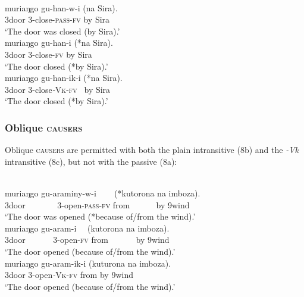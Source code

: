 \documentclass[output=paper]{langsci/langscibook}
\begin{document}
\ea\label{exx:}
\ea
{}\\
\gll muriaŋgo gu-han-w-i            (na Sira).\\
     3door       3-close-\textsc{pass}-\textsc{fv}    by  Sira\\
\glt ‘The door was closed (by Sira).’
\ex
{}\\
\gll muriaŋgo gu-han-i   (*na Sira).\\
     3door      3-close-\textsc{fv}   by   Sira\\
\glt ‘The door closed (*by Sira).’
\ex
{}\\
\gll muriaŋgo gu-han-ik-i     (*na Sira).\\
     3door       3-close\textit{-}\textsc{Vk}-\textsc{fv}~ by  Sira\\
\glt     ‘The door closed (*by Sira).’\\
     \z
     \z
     
\subsubsection{Oblique \textsc{causers}}

Oblique \textsc{causers} are permitted with both the plain intransitive (8b) and the \textit{-Vk} intransitive (8c), but not with the passive (8a):

\ea\label{exx:}
\ea
{}\\
\gll muriaŋgo gu-araminy-w-i ~~ ~(*kutorona na imboza).\\
     3door ~~~~~~~3-open-\textsc{pass}-\textsc{fv}      from ~~~~~ by 9wind\\
\glt ‘The door was opened (*because of/from the wind).’
\ex
{}\\
\gll muriaŋgo gu-aram-i ~~(kutorona na imboza).\\
     3door ~~~~~~3-open-\textsc{fv}    from ~~~~~~by 9wind\\
\glt ‘The door opened (because of/from the wind).’
\ex
{}\\
\gll muriaŋgo gu-aram-ik-i    (kuturona na imboza).\\
     3door       3-open\textit{-}\textsc{Vk}-\textsc{fv}   from       by 9wind\\
\glt ‘The door opened (because of/from the wind).’
\z
\z
\end{document}
